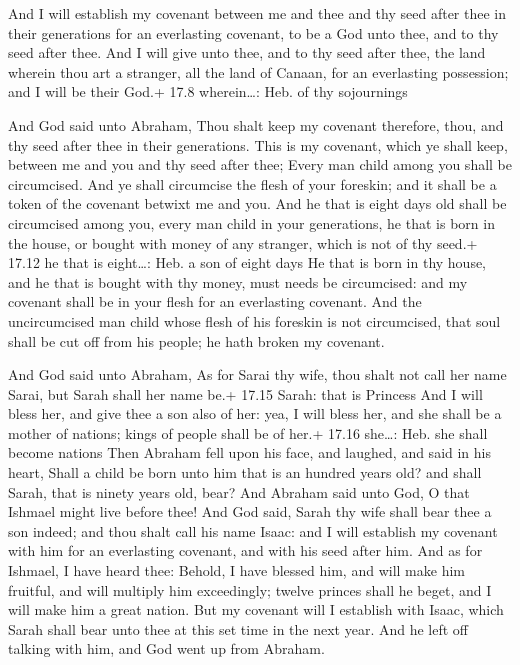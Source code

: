  And I will establish my covenant between me and thee and
thy seed after thee in their generations for an everlasting covenant, to
be a God unto thee, and to thy seed after thee.  And I will
give unto thee, and to thy seed after thee, the land wherein thou art a
stranger, all the land of Canaan, for an everlasting possession; and I
will be their God.+ 17.8 wherein\ldots: Heb. of thy sojournings

 And God said unto Abraham, Thou shalt keep my covenant
therefore, thou, and thy seed after thee in their generations.
 This is my covenant, which ye shall keep, between me and
you and thy seed after thee; Every man child among you shall be
circumcised.  And ye shall circumcise the flesh of your
foreskin; and it shall be a token of the covenant betwixt me and you.
 And he that is eight days old shall be circumcised among
you, every man child in your generations, he that is born in the house,
or bought with money of any stranger, which is not of thy seed.+ 17.12
he that is eight\ldots: Heb. a son of eight days  He that
is born in thy house, and he that is bought with thy money, must needs
be circumcised: and my covenant shall be in your flesh for an
everlasting covenant.  And the uncircumcised man child
whose flesh of his foreskin is not circumcised, that soul shall be cut
off from his people; he hath broken my covenant.

 And God said unto Abraham, As for Sarai thy wife, thou
shalt not call her name Sarai, but Sarah shall her name be.+ 17.15
Sarah: that is Princess  And I will bless her, and give
thee a son also of her: yea, I will bless her, and she shall be a mother
of nations; kings of people shall be of her.+ 17.16 she\ldots: Heb. she
shall become nations  Then Abraham fell upon his face, and
laughed, and said in his heart, Shall a child be born unto him that is
an hundred years old? and shall Sarah, that is ninety years old, bear?
 And Abraham said unto God, O that Ishmael might live
before thee!  And God said, Sarah thy wife shall bear thee
a son indeed; and thou shalt call his name Isaac: and I will establish
my covenant with him for an everlasting covenant, and with his seed
after him.  And as for Ishmael, I have heard thee: Behold,
I have blessed him, and will make him fruitful, and will multiply him
exceedingly; twelve princes shall he beget, and I will make him a great
nation.  But my covenant will I establish with Isaac, which
Sarah shall bear unto thee at this set time in the next year.
 And he left off talking with him, and God went up from
Abraham.

